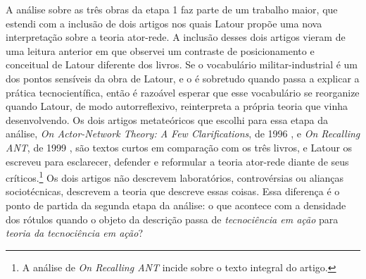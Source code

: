 A análise sobre as três obras da etapa 1 faz parte de um trabalho maior, que estendi com a inclusão de dois artigos nos quais Latour propõe uma nova interpretação sobre a teoria ator-rede. A inclusão desses dois artigos vieram de uma leitura anterior em que observei um contraste de posicionamento e conceitual de Latour diferente dos livros. Se o vocabulário militar-industrial é um dos pontos sensíveis da obra de Latour, e o é sobretudo quando passa a explicar a prática tecnocientífica, então é razoável esperar que esse vocabulário se reorganize quando Latour, de modo autorreflexivo, reinterpreta a própria teoria que vinha desenvolvendo. Os dois artigos metateóricos que escolhi para essa etapa da análise, \emph{On Actor-Network Theory: A Few Clarifications}, de 1996 \parencite{latour1996clarifications}, e \emph{On Recalling ANT}, de 1999 \parencite{Latour1999RecallingANT}, são textos curtos em comparação com os três livros, e Latour os escreveu para esclarecer, defender e reformular a teoria ator-rede diante de seus críticos.\footnote{A análise de \emph{On Recalling ANT} incide sobre o texto integral do artigo.} Os dois artigos não descrevem laboratórios, controvérsias ou alianças sociotécnicas, descrevem a teoria que descreve essas coisas. Essa diferença é o ponto de partida da segunda etapa da análise: o que acontece com a densidade dos rótulos quando o objeto da descrição passa de \emph{tecnociência em ação} para \emph{teoria da tecnociência em ação}?

